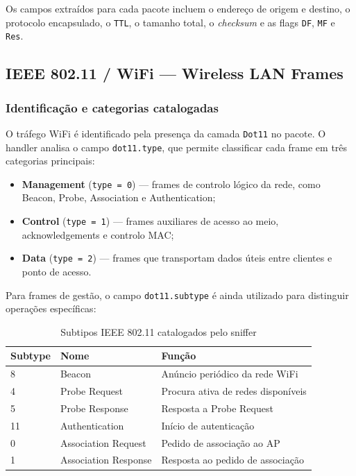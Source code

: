 \documentclass[a4paper,12pt]{article}
\begin{document}
Os campos extraídos para cada pacote incluem o endereço de origem e destino, o protocolo
encapsulado, o \texttt{TTL}, o tamanho total, o \textit{checksum} e as flags \texttt{DF},
\texttt{MF} e \texttt{Res}.





\subsection{IEEE 802.11 / WiFi — Wireless LAN Frames}

\subsubsection{Identificação e categorias catalogadas}

O tráfego WiFi é identificado pela presença da camada \texttt{Dot11} no pacote. O handler analisa o campo \texttt{dot11.type}, que permite classificar cada frame em três categorias principais:

\begin{itemize}
    \item \textbf{Management} (\texttt{type = 0}) — frames de controlo lógico da rede, como Beacon, Probe, Association e Authentication;
    \item \textbf{Control} (\texttt{type = 1}) — frames auxiliares de acesso ao meio, acknowledgements e controlo MAC;
    \item \textbf{Data} (\texttt{type = 2}) — frames que transportam dados úteis entre clientes e ponto de acesso.
\end{itemize}

Para frames de gestão, o campo \texttt{dot11.subtype} é ainda utilizado para distinguir operações específicas:

\begin{table}[H]
\centering
\begin{tabular}{lll}
\toprule
\textbf{Subtype} & \textbf{Nome} & \textbf{Função} \\
\midrule
8  & Beacon              & Anúncio periódico da rede WiFi \\
4  & Probe Request       & Procura ativa de redes disponíveis \\
5  & Probe Response      & Resposta a Probe Request \\
11 & Authentication      & Início de autenticação \\
0  & Association Request & Pedido de associação ao AP \\
1  & Association Response& Resposta ao pedido de associação \\
\bottomrule
\end{tabular}
\caption{Subtipos IEEE 802.11 catalogados pelo sniffer}
\end{table}
\end{document}
